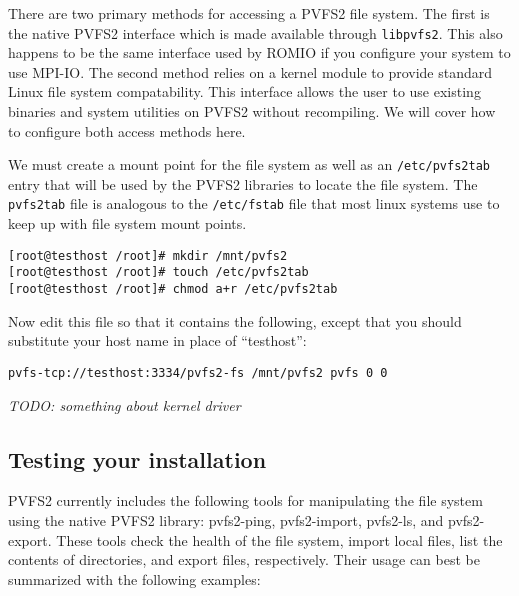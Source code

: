 \documentclass[11pt, letterpaper]{article}
\begin{document}
There are two primary methods for accessing a PVFS2 file system.  The
first is the native PVFS2 interface which is made available
through {\tt libpvfs2}.  This also happens to be the same interface used by
ROMIO if you configure your system to use MPI-IO.  The second method
relies on a kernel module to provide standard Linux file system
compatability.  This interface allows the user to use existing
binaries and system utilities on PVFS2 without recompiling.  We will
cover how to configure both access methods here.

We must create a mount point for the file system as well as
an {\tt /etc/pvfs2tab} entry that will be used by
the PVFS2 libraries to locate the file system.  The {\tt pvfs2tab} file is
analogous to the {\tt /etc/fstab} file that most linux systems use to keep up
with file system mount points.

\begin{verbatim}
[root@testhost /root]# mkdir /mnt/pvfs2
[root@testhost /root]# touch /etc/pvfs2tab
[root@testhost /root]# chmod a+r /etc/pvfs2tab
\end{verbatim}

Now edit this file so that it contains the following, except that you should
substitute your host name in place of ``testhost'':

\begin{verbatim}
pvfs-tcp://testhost:3334/pvfs2-fs /mnt/pvfs2 pvfs 0 0 
\end{verbatim}


\emph{TODO: something about kernel driver}

\subsection{Testing your installation}

PVFS2 currently includes the following tools for manipulating the file system
using the native PVFS2 library: pvfs2-ping, pvfs2-import, pvfs2-ls, and pvfs2-export.  These tools check the health of the file system, import local files, 
list the contents of directories, and export files, respectively.  Their usage 
can best be summarized with the following examples:
\end{document}
